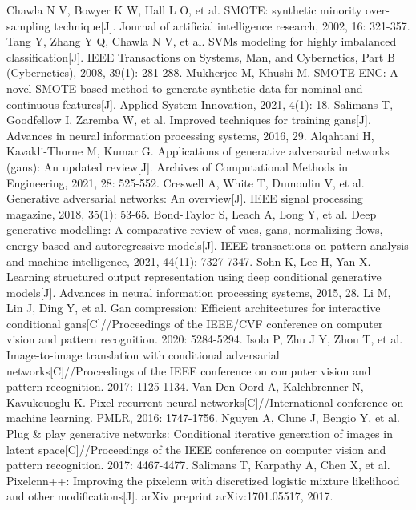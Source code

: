 \documentclass{NauThesis}
\begin{document}
\begin{thebibliography}{99}
Chawla N V, Bowyer K W, Hall L O, et al. SMOTE: synthetic minority over-sampling technique[J]. Journal of artificial intelligence research, 2002, 16: 321-357.
Tang Y, Zhang Y Q, Chawla N V, et al. SVMs modeling for highly imbalanced classification[J]. IEEE Transactions on Systems, Man, and Cybernetics, Part B (Cybernetics), 2008, 39(1): 281-288.
Mukherjee M, Khushi M. SMOTE-ENC: A novel SMOTE-based method to generate synthetic data for nominal and continuous features[J]. Applied System Innovation, 2021, 4(1): 18.
Salimans T, Goodfellow I, Zaremba W, et al. Improved techniques for training gans[J]. Advances in neural information processing systems, 2016, 29.
Alqahtani H, Kavakli-Thorne M, Kumar G. Applications of generative adversarial networks (gans): An updated review[J]. Archives of Computational Methods in Engineering, 2021, 28: 525-552.
Creswell A, White T, Dumoulin V, et al. Generative adversarial networks: An overview[J]. IEEE signal processing magazine, 2018, 35(1): 53-65.
Bond-Taylor S, Leach A, Long Y, et al. Deep generative modelling: A comparative review of vaes, gans, normalizing flows, energy-based and autoregressive models[J]. IEEE transactions on pattern analysis and machine intelligence, 2021, 44(11): 7327-7347.
Sohn K, Lee H, Yan X. Learning structured output representation using deep conditional generative models[J]. Advances in neural information processing systems, 2015, 28.
Li M, Lin J, Ding Y, et al. Gan compression: Efficient architectures for interactive conditional gans[C]//Proceedings of the IEEE/CVF conference on computer vision and pattern recognition. 2020: 5284-5294.
Isola P, Zhu J Y, Zhou T, et al. Image-to-image translation with conditional adversarial networks[C]//Proceedings of the IEEE conference on computer vision and pattern recognition. 2017: 1125-1134.
Van Den Oord A, Kalchbrenner N, Kavukcuoglu K. Pixel recurrent neural networks[C]//International conference on machine learning. PMLR, 2016: 1747-1756.
Nguyen A, Clune J, Bengio Y, et al. Plug \& play generative networks: Conditional iterative generation of images in latent space[C]//Proceedings of the IEEE conference on computer vision and pattern recognition. 2017: 4467-4477.
Salimans T, Karpathy A, Chen X, et al. Pixelcnn++: Improving the pixelcnn with discretized logistic mixture likelihood and other modifications[J]. arXiv preprint arXiv:1701.05517, 2017.

\end{thebibliography}
\end{document}
